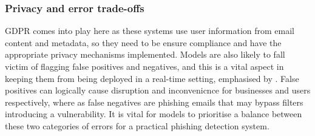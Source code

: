 
\subsubsection*{Privacy and error trade-offs}
GDPR comes into play here as these systems use user information from email content and metadata, so they need to be ensure compliance and have the appropriate privacy mechanisms implemented. Models are also likely to fall victim of flagging false positives and negatives, and this is a vital aspect in keeping them from being deployed in a real-time setting, emphasised by \cite{vishwanath2011people}. False positives can logically cause disruption and inconvenicnce for businesses and users respectively, where as false negatives are phishing emails that may bypass filters introducing a vulnerability. It is vital for models to prioritise a balance between these two categories of errors for a practical phishing detection system.
